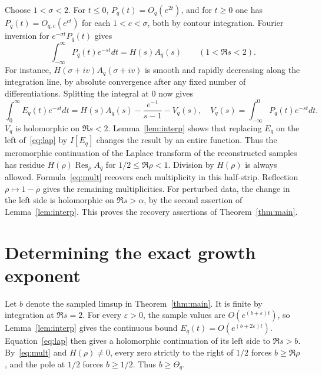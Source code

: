 \documentclass[11pt]{article}
\DeclareMathOperator*{\Res}{Res}
\newcommand{\eps}{\varepsilon}
\begin{document}
Choose $1<\sigma<2$. For $t\le0$, $P_q(t)=O_q(e^{2t})$, and for $t\ge0$ one has $P_q(t)=O_{q,c}(e^{ct})$ for each $1<c<\sigma$, both by contour integration. Fourier inversion for $e^{-\sigma t}P_q(t)$ gives
\[
 \int_{-\infty}^\infty P_q(t)e^{-st}dt=H(s)A_q(s)\qquad(1<\Re s<2).
\]
For instance, $H(\sigma+iv)A_q(\sigma+iv)$ is smooth and rapidly decreasing along the integration line, by absolute convergence after any fixed number of differentiations. Splitting the integral at $0$ now gives
\begin{equation}\label{eq:lap}
 \int_0^\infty E_q(t)e^{-st}dt
  =H(s)A_q(s)-\frac{e^{-1}}{s-1}-V_q(s),
 \quad V_q(s)=\int_{-\infty}^0 P_q(t)e^{-st}dt .
\end{equation}
$V_q$ is holomorphic on $\Re s<2$. Lemma~\ref{lem:interp} shows that replacing $E_q$ on the left of~\eqref{eq:lap} by $I[E_q]$ changes the result by an entire function. Thus the meromorphic continuation of the Laplace transform of the reconstructed samples has residue $H(\rho)\Res_\rho A_q$ for $1/2\le\Re\rho<1$. Division by $H(\rho)$ is always allowed. Formula~\eqref{eq:mult} recovers each multiplicity in this half-strip. Reflection $\rho\mapsto1-\overline\rho$ gives the remaining multiplicities. For perturbed data, the change in the left side is holomorphic on $\Re s>\alpha$, by the second assertion of Lemma~\ref{lem:interp}. This proves the recovery assertions of Theorem~\ref{thm:main}.

\section{Determining the exact growth exponent}

Let $b$ denote the sampled limsup in Theorem~\ref{thm:main}. It is finite by integration at $\Re s=2$. For every $\eps>0$, the sample values are $O(e^{(b+\eps)t})$, so Lemma~\ref{lem:interp} gives the continuous bound $E_q(t)=O(e^{(b+2\eps)t})$. Equation~\eqref{eq:lap} then gives a holomorphic continuation of its left side to $\Re s>b$. By~\eqref{eq:mult} and $H(\rho)\ne0$, every zero strictly to the right of $1/2$ forces $b\ge\Re\rho$, and the pole at $1/2$ forces $b\ge1/2$. Thus $b\ge\Theta_q$.
\end{document}
